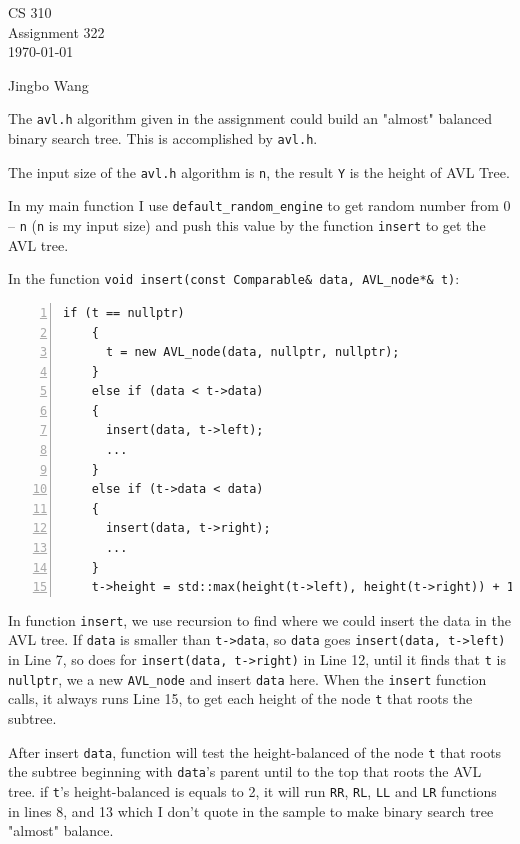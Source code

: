 \documentclass[11pt]{article}
\newcommand{\name}{Jingbo Wang}
\begin{document}
\thispagestyle{empty}

\begin{center}
{\large CS 310}\\
Assignment 322\\
\today
\end{center}

\begin{flushright}
\name{}
\end{flushright}

The \texttt{avl.h} algorithm given in the assignment could build an "almost" 
balanced binary search tree. This is accomplished by \texttt{avl.h}.

The input size of the \texttt{avl.h} algorithm is \texttt{n}, the result \texttt{Y}
is the height of AVL Tree.

In my main function I use \texttt{default\_random\_engine} to get random number from 
0 -- \texttt{n} (\texttt{n} is my input size) and push this value by the function 
\texttt{insert} to get the AVL tree.

In the function \texttt{void insert(const Comparable\& data, AVL\_node*\& t)}:
\begin{Verbatim}[numbers=left,xleftmargin=5mm]
    if (t == nullptr)
    {
      t = new AVL_node(data, nullptr, nullptr);
    }
    else if (data < t->data)
    {
      insert(data, t->left);
      ...
    }
    else if (t->data < data)
    {
      insert(data, t->right);
      ...
    }
    t->height = std::max(height(t->left), height(t->right)) + 1;
\end{Verbatim}

In function \texttt{insert}, we use recursion to find where we could insert the data 
in the AVL tree. If \texttt{data} is smaller than \texttt{t->data}, so \texttt{data} 
goes \texttt{insert(data, t->left)} in Line 7, so does for \texttt{insert(data, t->right)}
in Line 12, until it finds that \texttt{t} is \texttt{nullptr}, we a new \texttt{AVL\_node}
and insert \texttt{data} here. When the \texttt{insert} function calls, it always runs
Line 15, to get each height of the node \texttt{t} that roots the subtree.

After insert \texttt{data}, function will test the height-balanced of the node \texttt{t} 
that roots the subtree beginning with \texttt{data}'s parent until to the top that roots 
the AVL tree. if \texttt{t}'s height-balanced is equals to 2, it will run \texttt{RR}, 
\texttt{RL}, \texttt{LL} and \texttt{LR} functions in lines 8, and 13 which I don't quote 
in the sample to make binary search tree "almost" balance. 
\end{document}

